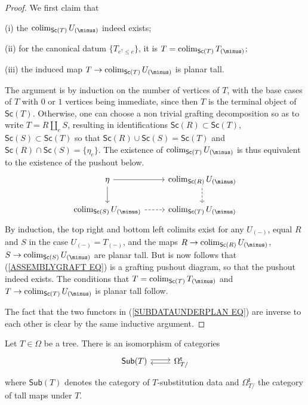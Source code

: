 \documentclass[a4paper,10pt]{article}%
\begin{document}
\begin{proof}
We first claim that
\begin{inparaenum}
\item[(i)] the $\colim_{\mathsf{Sc}(T)} U_{(\minus)}$ indeed exists;
\item[(ii)] for the canonical datum $\{T_{e^{\uparrow}\leq e}\}$, it is $T = \colim_{\mathsf{Sc}(T)} T_{(\minus)}$;
\item[(iii)] the induced map
$T \to \colim_{\mathsf{Sc}(T)} U_{(\minus)}$ is planar tall.
\end{inparaenum}
 
The argument is by induction on the number of vertices of $T$, with the base cases of $T$ with $0$ or $1$ vertices being immediate, since then $T$ is the terminal object of $\mathsf{Sc}(T)$.
Otherwise, one can choose a non trivial grafting decomposition so as to write $T = R \amalg_e S$, resulting 
in identifications 
$\mathsf{Sc}(R) \subset \mathsf{Sc}(T)$, 
$\mathsf{Sc}(S) \subset \mathsf{Sc}(T)$
so that 
$\mathsf{Sc}(R) \cup \mathsf{Sc}(S) = \mathsf{Sc}(T)$
and 
$\mathsf{Sc}(R) \cap \mathsf{Sc}(S) = \{\eta_e \}$.
The existence of $\colim_{\mathsf{Sc}(T)}U_{(\minus)}$
is thus equivalent to the existence of the pushout below.
\begin{equation}\label{ASSEMBLYGRAFT EQ}
\begin{tikzcd}
	\eta \ar{r} \ar{d} & \colim_{\mathsf{Sc}(R)}U_{(\minus)} \ar[dashed,d]
\\
	\colim_{\mathsf{Sc}(S)}U_{(\minus)} \ar[dashed,r] &
	\colim_{\mathsf{Sc}(T)}U_{(\minus)}
\end{tikzcd}
\end{equation}
By induction, the top right and bottom left colimits exist for any $U_{(\minus)}$, 
equal $R$ and $S$ in the case $U_{(\minus)} = T_{(\minus)}$,
and the maps 
$R \to \colim_{\mathsf{Sc}(R)}U_{(\minus)}$,
$S \to \colim_{\mathsf{Sc}(S)}U_{(\minus)}$
are planar tall.
But is now follows that (\ref{ASSEMBLYGRAFT EQ}) is a grafting pushout diagram, so that the pushout indeed exists. The conditions that
$T = \colim_{\mathsf{Sc}(T)}T_{(\minus)}$
and 
$T \to \colim_{\mathsf{Sc}(T)}U_{(\minus)}$
is planar tall follow.

The fact that the two functors in (\ref{SUBDATAUNDERPLAN EQ})
are inverse to each other is clear by the same inductive argument.
\end{proof}


\begin{corollary}\label{SUBDATAUNDERPLAN COR}
Let $T \in \Omega$ be a tree. There is an isomorphism of categories
\begin{equation}\label{SUBDATAUNDERNONPL EQ}
\begin{tikzcd}[row sep =0pt]
	\mathsf{Sub}(T) \ar[r,shift left=2pt] &
	\Omega_{T/}^{\mathsf{t}} \ar[l,shift left=2pt]
\end{tikzcd}
\end{equation}
where $\mathsf{Sub}(T)$ denotes the category of $T$-substitution data and $\Omega_{T/}^{\mathsf{t}}$
the category of tall maps under $T$.
\end{corollary}
\end{document}
